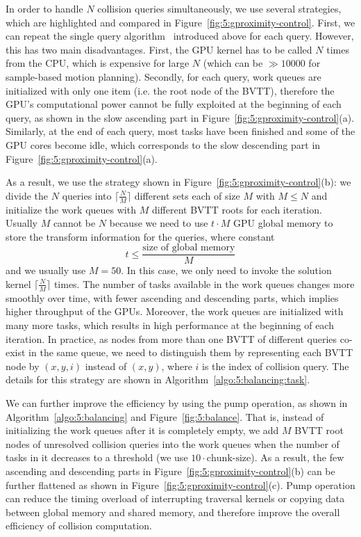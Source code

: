 In order to handle $N$ collision queries simultaneously, we use several strategies, which are highlighted and compared in Figure~\ref{fig:5:gproximity-control}. First, we can repeat the single query algorithm~\cite{Lauterbach10} introduced above for each query. However, this has two main disadvantages. First, the GPU kernel has to be called $N$ times from the CPU, which is expensive for large $N$ (which can be $\gg 10000$ for sample-based motion planning). Secondly, for each query, work queues are initialized with only one item (i.e. the root node of the BVTT), therefore the GPU's computational power cannot be fully exploited at the beginning of each query, as shown in the slow ascending part in Figure~\ref{fig:5:gproximity-control}(a). Similarly, at the end of each query, most tasks have been finished and some of the GPU cores become idle, which corresponds to the slow descending part in Figure~\ref{fig:5:gproximity-control}(a).

As a result, we use the strategy shown in Figure~\ref{fig:5:gproximity-control}(b): we divide the $N$ queries into $\lceil\frac{N}{M}\rceil$ different sets each of size $M$ with $M\leq N$ and initialize the work queues with $M$ different BVTT roots for each iteration. Usually $M$ cannot be $N$ because we need to use $t \cdot M$ GPU global memory to store the transform information for the queries, where constant $$t \leq \frac{\text{size of global memory}}{M}$$ and we usually use $M=50$. In this case, we only need to invoke the solution kernel $\lceil\frac{N}{M}\rceil$ times. The number of tasks available in the work queues changes more smoothly over time, with fewer ascending and descending parts, which implies higher
throughput of the GPUs. Moreover, the work queues are initialized with many more tasks, which results in high performance at the beginning of each iteration. In practice, as nodes from more than one BVTT of different queries co-exist in the same queue, we need to distinguish them by representing each BVTT node by $(x,y,i)$ instead of $(x,y)$, where $i$ is the index of collision query. The details for this strategy are shown in Algorithm~\ref{algo:5:balancing:task}.

We can further improve the efficiency by using the pump operation, as shown in Algorithm~\ref{algo:5:balancing} and Figure~\ref{fig:5:balance}. That is, instead of initializing the work queues after it is completely empty, we add $M$ BVTT root nodes of unresolved collision queries into the work queues when the number of tasks in it decreases to a threshold (we use $10\cdot \text{chunk-size}$). As a result, the few ascending and descending parts in Figure~\ref{fig:5:gproximity-control}(b) can be further flattened as shown in Figure~\ref{fig:5:gproximity-control}(c). Pump operation can reduce the timing overload of interrupting traversal kernels or copying data between global memory and shared memory, and therefore improve the overall efficiency of collision computation.


